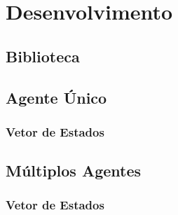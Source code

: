 \chapter{Desenvolvimento \label{chap:Desenvolvimento}}



\section{Biblioteca}

\section{Agente Único}

\subsection{Vetor de Estados}

\section{Múltiplos Agentes}

\subsection{Vetor de Estados}


